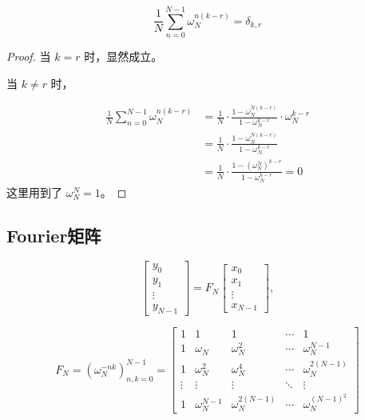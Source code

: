 \documentclass[12pt,a4paper]{article}
\numberwithin{subsection}{section}   %
\numberwithin{subsubsection}{subsection}
\theoremstyle{plain}
\theoremstyle{definition}
\theoremstyle{remark}
\theoremstyle{remark}
\begin{document}
\begin{equation}
\frac{1}{N}\sum_{n=0}^{N-1}\omega_N^{n(k-r)}=\delta_{k,r}
\end{equation}

	\begin{proof}
		当 $k=r$ 时，显然成立。
		
		当 $k \neq r$ 时，
		
\begin{equation}
	\begin{aligned}
		\frac{1}{N}\sum_{n=0}^{N-1}\omega_N^{n(k-r)} &= \frac{1}{N} \cdot \frac{1 - \omega_N^{N(k-r)}}{1 - \omega_N^{k-r}} \cdot \omega_N^{k-r} \\[8pt]
		&= \frac{1}{N} \cdot \frac{1 - \omega_N^{N(k-r)}}{1 - \omega_N^{k-r}} \\[8pt]
		&= \frac{1}{N} \cdot \frac{1 - (\omega_N^N)^{k-r}}{1 - \omega_N^{k-r}} = 0
	\end{aligned}
\end{equation}
这里用到了 $\omega_N^N = 1$。
	\end{proof}
	
	\subsection{Fourier矩阵}
	
	\begin{equation}
		\begin{bmatrix}
			y_0 \\
			y_1 \\
			\vdots \\
			y_{N-1}
		\end{bmatrix}
		= F_N
		\begin{bmatrix}
			x_0 \\
			x_1 \\
			\vdots \\
			x_{N-1}
		\end{bmatrix},
	\end{equation}

	\begin{equation}
		F_N = \left( \omega_N^{-nk} \right)_{n,k=0}^{N-1}
		=
		\begin{bmatrix}
			1 & 1 & 1 & \cdots & 1 \\
			1 & \omega_N & \omega_N^2 & \cdots & \omega_N^{N-1} \\
			1 & \omega_N^2 & \omega_N^4 & \cdots & \omega_N^{2(N-1)} \\
			\vdots & \vdots & \vdots & \ddots & \vdots \\
			1 & \omega_N^{N-1} & \omega_N^{2(N-1)} & \cdots & \omega_N^{(N-1)^2}
		\end{bmatrix}
	\end{equation}
	
\end{document}

